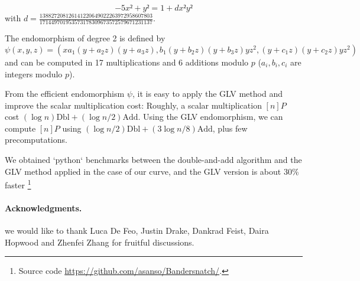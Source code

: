\documentclass{amsart}
\begin{document}
$$-5x²+y² = 1+dx²y²$$ with $d=\frac{138827208126141220649022263972958607803}{171449701953573178309673572579671231137}$.

\medskip
The endomorphism of degree 2 is defined by
$$\psi(x,y,z) = (xa_1(y+a_2z)(y+a_3z), b_1(y+b_2z)(y+b_3z)yz^2, (y+c_1z)(y+c_2z)yz^2)$$
and can be computed in 17 multiplications and 6 additions modulo $p$ ($a_i, b_i, c_i$ are integers modulo $p$).

From the efficient endomorphism $\psi$, it is easy to apply the GLV method and improve the scalar multiplication cost:
Roughly, a scalar multiplication $[n]P$ cost $(\log n) \text{Dbl} + (\log n/2) \text{Add}$.
Using the GLV endomorphism, we can compute $[n]P$ using $(\log n/2 )\text{Dbl} + (3\log n/8) \text{Add}$, plus few precomputations.

We obtained `python` benchmarks between the double-and-add algorithm and the GLV method applied in the case of our curve, and the GLV version is about 30\% faster 
\footnote{Source code \url{https://github.com/asanso/Bandersnatch/}.}

\bigskip
\paragraph*{\textbf{Acknowledgments.}} we would like to thank Luca De Feo, Justin Drake, Dankrad Feist, Daira Hopwood and Zhenfei Zhang for fruitful discussions.

{}

\end{document}
